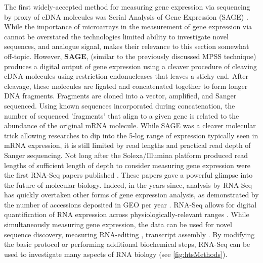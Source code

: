 The first widely-accepted method for measuring gene expression via sequencing by proxy of cDNA molecules was Serial Analysis of Gene Expression (SAGE) \citep{Velculescu1995a}. While the importance of microarrays in the measurement of gene expression via cannot be overstated \citep{Shendure2008,Marioni2008} the technologies limited ability to investigate novel sequences, and analogue signal, makes their relevance to this section somewhat off-topic. However, \textbf{SAGE}, (similar to the previously discussed MPSS technique) produces a digital output of gene expression using a cleaver procedure of cleaving cDNA molecules using restriction endonucleases that leaves a sticky end. After cleavage, these molecules are ligated and concatenated together to form longer DNA fragments. Fragments are cloned into a vector, amplified, and Sanger sequenced. Using known sequences incorporated during concatenation, the number of sequenced 'fragments' that align to a given gene is related to the abundance of the original mRNA molecule. While SAGE was a cleaver molecular trick allowing researches to dip into the 5-log range of expression typically seen in mRNA expression, it is still limited by read lengths and practical read depth of Sanger sequencing. 
Not long after the Solexa/Illumina platform produced read lengths of sufficient length of depth to consider measuring gene expression were the first RNA-Seq papers published \citep{Mortazavi2008, Nagalakshmi2008,Lister2008}. These papers gave a powerful glimpse into the future of molecular biology. Indeed, in the years since, analysis by RNA-Seq has quickly overtaken other forms of gene expression analysis, as demonstrated by the number of accessions deposited in GEO per year \citep{Barrett2013}. RNA-Seq allows for digital quantification of RNA expression across physiologically-relevant ranges \citep{Blencowe2009}. While simultaneously measuring gene expression, the data can be used for novel sequence discovery, measuring RNA-editing \citep{Li2011}, transcript assembly \citep{Trapnell2010}. By modifying the basic protocol or performing additional biochemical steps, RNA-Seq can be used to investigate many aspects of RNA biology (see \ref{fig:htsMethods}). 

